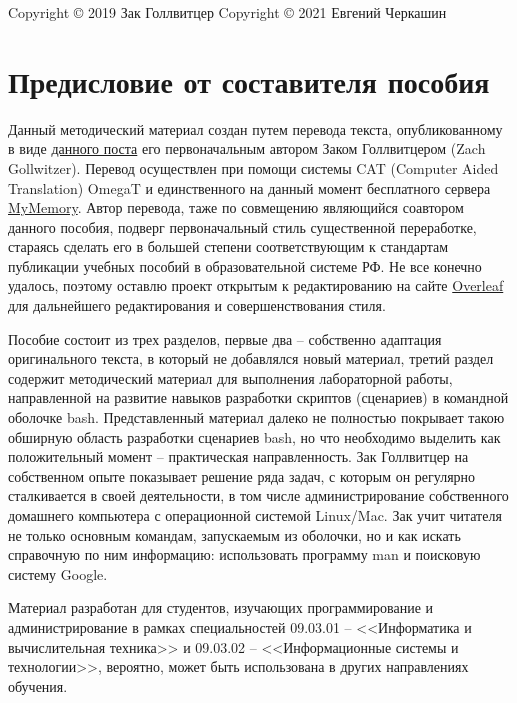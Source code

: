 \documentclass[12pt]{article}
\begin{document}
Copyright © 2019 Зак Голлвитцер
Copyright © 2021 Евгений Черкашин

\clearpage

\setcounter{tocdepth}{3}
\tableofcontents

\clearpage

\section*{Предисловие от составителя пособия}

Данный методический материал создан путем перевода текста, опубликованному в виде \href{https://zachgoll.github.io/blog/2019/bash-essentials/}{данного поста} его первоначальным автором Заком Голлвитцером (Zach Gollwitzer). Перевод осуществлен при помощи системы CAT (Computer Aided Translation) OmegaT и единственного на данный момент бесплатного сервера \href{https://mymemory.translated.net/}{MyMemory}. Автор перевода, таже по совмещению являющийся соавтором данного пособия, подверг первоначальный стиль существенной переработке, стараясь сделать его в большей степени соответствующим к стандартам публикации учебных пособий в образовательной системе РФ. Не все конечно удалось, поэтому оставлю проект открытым к редактированию на сайте \href{https://www.overleaf.com/project/602cc04c00be7fbbe118f862}{Overleaf} для дальнейшего редактирования и совершенствования стиля.

Пособие состоит из трех разделов, первые два -- собственно адаптация оригинального текста, в который не добавлялся новый материал, третий раздел содержит методический материал для выполнения лабораторной работы, направленной на развитие навыков разработки скриптов (сценариев) в командной оболочке bash. Представленный материал далеко не полностью покрывает такою обширную область разработки сценариев bash, но что необходимо выделить как положительный момент -- практическая направленность. Зак Голлвитцер на собственном опыте показывает решение ряда задач, с которым он регулярно сталкивается в своей деятельности, в том числе администрирование собственного домашнего компьютера с операционной системой Linux/Mac. Зак учит читателя не только основным командам, запускаемым из оболочки, но и как искать справочную по ним информацию: использовать программу man и поисковую систему Google.

Материал разработан для студентов, изучающих программирование и администрирование в рамках специальностей 09.03.01 -- <<Информатика и вычислительная техника>> и 09.03.02 -- <<Информационные системы и технологии>>, вероятно, может быть использована в других направлениях обучения.
\end{document}
